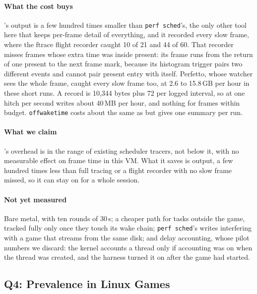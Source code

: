 \paragraph{What the cost buys} \sys's output is a few hundred times smaller than
\texttt{perf sched}'s, the only other tool here that keeps per-frame detail
of everything, and it recorded every slow frame, where the ftrace flight
recorder caught 10 of 21 and 44 of 60. That recorder misses frames whose
extra time was inside present: its frame runs from the return of one present
to the next frame mark, because its histogram trigger pairs two different
events and cannot pair present entry with itself. Perfetto, whose watcher
sees the whole frame, caught every slow frame too, at 2.6 to 15.8\,GB per
hour in these short runs. A record is 10,344 bytes
plus 72 per logged interval, so at one hitch per second \sys writes about
40\,MB per hour, and nothing for frames within budget. \texttt{offwaketime}
costs about the same as \sys but gives one summary per run.

\paragraph{What we claim} \sys's overhead is in the range of existing
scheduler tracers, not below it, with no measurable effect on frame time in
this VM. What it saves is output, a few hundred times less than full tracing
or a flight recorder with no slow frame missed, so it can stay on for a
whole session.

\paragraph{Not yet measured} Bare metal, with ten rounds of 30\,s; a cheaper path
for tasks outside the game, tracked fully only once they touch its wake
chain; \texttt{perf sched}'s writes interfering with a game that streams from
the same disk; and delay accounting, whose pilot numbers we discard: the
kernel accounts a thread only if accounting was on when the thread was
created, and the harness turned it on after the game had started.

\subsection{Q4: Prevalence in Linux Games}
\label{sec:eval-prevalence}

